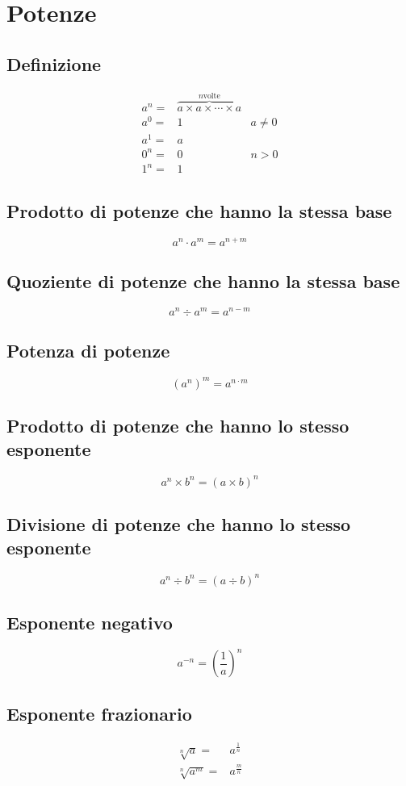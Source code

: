 \chapter{Potenze}
\section{Definizione}
\begin{align}
a^n=&\overbrace{a\times a\times\cdots\times a}^{n{}\mbox{volte}}\\
a^0=&1&a\neq0\\
a^1=&a\\
0^n=&0&n>0\\
1^n=&1%
\end{align}
\section{Prodotto di potenze che hanno la stessa base}
\begin{equation}
a^n\cdot a^m=a^{n+m}
\end{equation}
\section{Quoziente di potenze che hanno la stessa base}
\begin{equation}
a^n\div a^m=a^{n-m}
\end{equation}
\section{Potenza di potenze}
\begin{equation}
(a^n)^m=a^{n\cdot m}
\end{equation}
\section{Prodotto di potenze che hanno lo stesso esponente}
\begin{equation}
a^n\times b^n=(a\times b)^n
\end{equation}
\section{Divisione di potenze che hanno lo stesso esponente}
\begin{equation}
a^n\div b^n=(a\div b )^n
\end{equation}
\section{Esponente negativo}
\begin{equation}
a^{-n}=\left(\dfrac{1}{a}\right)^n
\end{equation}
\section{Esponente frazionario}
\begin{align}
\sqrt[n]{a}=&a^{\frac{1}{n}}\\
\sqrt[n]{a^m}=&a^{\frac{m}{n}}
\end{align}
